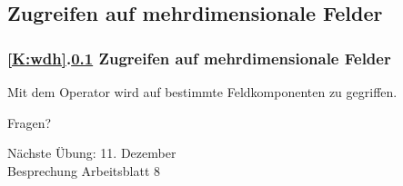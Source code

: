 \documentclass[c,18pt]{beamer}
\begin{document}
\def\stitle{Zugreifen auf mehrdimensionale Felder}
\subsection{\stitle}\label{S:Zugreifen}
\begin{frame}[t]%
  \frametitle{\ref{K:wdh}.\ref{S:Zugreifen} \stitle}
\medskip

Mit dem Operator \code{[]} wird auf bestimmte Feldkomponenten zu gegriffen.


\end{frame}

\setcounter{exercise}{27}

\setcounter{exercise}{28}

\setcounter{exercise}{29}

\setcounter{exercise}{30}



\begin{frame}
\centering
\Huge\textcolor{KITgreen}{Fragen?}
\vspace{2cm}

{\LARGE
N\"achste \"Ubung: 11. Dezember\\
Besprechung Arbeitsblatt 8
}
\end{frame}


\end{document}
